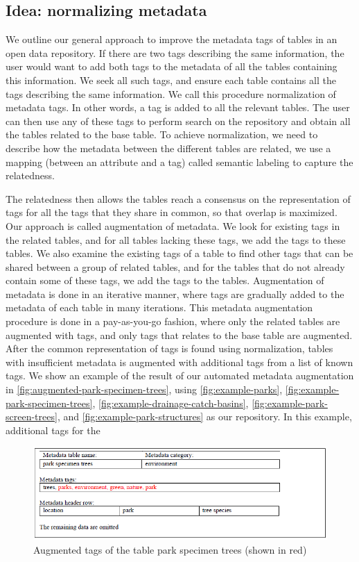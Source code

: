 \subsection{Idea: normalizing metadata}
We outline our general approach to improve the metadata tags of tables in an open data repository. If there are two tags describing the same information, the user would want to add both tags to the metadata of all the tables containing this information. We seek all such tags, and ensure each table contains all the tags describing the same information. We call this procedure normalization of metadata tags. In other words, a tag is added to all the relevant tables.
The user can then use any of these tags to perform search on the repository and obtain all the tables related to the base table. To achieve normalization, we need to describe how the metadata between the different tables are related, we use a mapping (between an attribute and a tag) called semantic labeling to capture the relatedness.

The relatedness then allows the tables reach a consensus on the representation of tags for all the tags that they share in common, so that overlap is maximized. Our approach is called augmentation of metadata. We look for existing tags in the related tables, and for all tables lacking these tags, we add the tags to these tables. We also examine the existing tags of a table to find other tags that can be shared between a group of related tables, and for the tables that do not already contain some of these tags, we add the tags to the tables. Augmentation of metadata is done in an iterative manner, where tags are gradually added to the metadata of each table in many iterations. This metadata augmentation procedure is done in a pay-as-you-go fashion, where only the related tables are augmented with tags, and only tags that relates to the base table are augmented.
After the common representation of tags is found using normalization, tables with insufficient metadata is augmented with additional tags from a list of known tags. We show an example of the result of our automated metadata augmentation in \autoref{fig:augmented-park-specimen-trees}, using \autoref{fig:example-parks}, \autoref{fig:example-park-specimen-trees}, \autoref{fig:example-drainage-catch-basins}, \autoref{fig:example-park-screen-trees}, and \autoref{fig:example-park-structures} as our repository. In this example, additional tags for the

\begin{figure}
    \centering
    \includegraphics[width=5in]{figures/augmented-park-specimen-trees.png}
    \caption{Augmented tags of the table park specimen trees (shown in red)}
    \label{fig:augmented-park-specimen-trees}
\end{figure}

